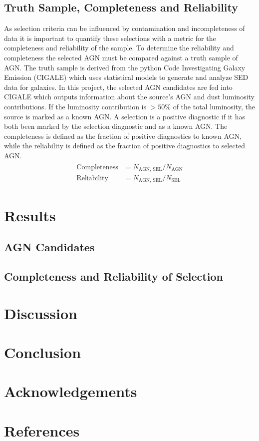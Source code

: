 \documentclass[12pt]{iopart}
\begin{document}
\subsection{Truth Sample, Completeness and Reliability}
As selection criteria can be influenced by contamination and incompleteness of data it is important to quantify these selections with a metric for the completeness and reliability of the sample. To determine the reliability and completeness the selected AGN must be compared against a truth sample of AGN. The truth sample is derived from the python Code Investigating Galaxy Emission (CIGALE) \cite{boquien_cigale_2019, yang_x-cigale_2020} which uses statistical models to generate and analyze SED data for galaxies. In this project, the selected AGN candidates are fed into CIGALE which outputs information about the source's AGN and dust luminosity contributions. If the luminosity contribution is $>50\%$ of the total luminosity, the source is marked as a known AGN. A selection is a positive diagnostic if it has both been marked by the selection diagnostic and as a known AGN. The completeness is defined as the fraction of positive diagnostics to known AGN, while the reliability is defined as the fraction of positive diagnostics to selected AGN. 
\begin{align*}
    \begin{split}
        \text{Completeness} &= N_{\text{AGN, SEL} }/N_{\text{AGN}}\\
        \text{Reliability} &= N_{\text{AGN, SEL} }/N_{\text{SEL}}
    \end{split}
\end{align*}
\section{Results}
\subsection{AGN Candidates}
\subsection{Completeness and Reliability of Selection}
\section{Discussion}
\section{Conclusion}
\section{Acknowledgements}
\newpage
\section{References}



\end{document}
